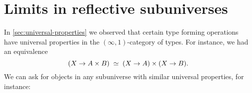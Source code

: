 

\section{Limits in reflective subuniverses}
\label{sec:pullbacks}

In \autoref{sec:universal-properties} we observed that certain type forming operations have universal properties in the
$(\infty,1)$-category of types.
For instance, we had an equivalence
\[ (X\to A\times B)  \;\simeq\; (X\to A)\times (X\to B). \]
We can ask for objects in any subuniverse with similar universal properties, for instance:


